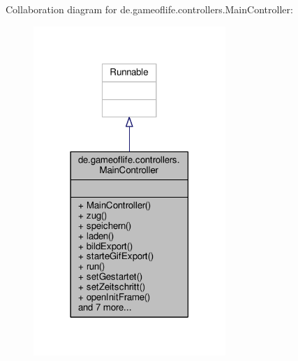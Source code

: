 Collaboration diagram for de.\-gameoflife.\-controllers.\-Main\-Controller\-:\nopagebreak
\begin{figure}[H]
\begin{center}
\leavevmode
\includegraphics[width=206pt]{classde_1_1gameoflife_1_1controllers_1_1MainController__coll__graph}
\end{center}
\end{figure}
